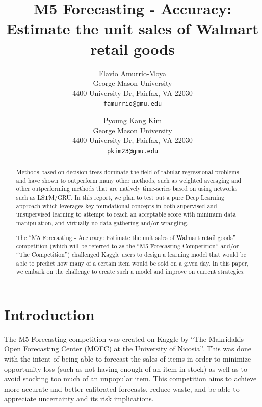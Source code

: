 \documentclass[10pt,twocolumn,letterpaper]{article}
\begin{document}
\title{M5 Forecasting - Accuracy: Estimate the unit sales of Walmart retail goods}

\author{Flavio Amurrio-Moya\\
George Mason University\\
4400 University Dr, Fairfax, VA 22030\\
{\tt\small famurrio@gmu.edu}
\and
Pyoung Kang Kim\\
George Mason University\\
4400 University Dr, Fairfax, VA 22030\\
{\tt\small pkim23@gmu.edu}
}

\maketitle
\thispagestyle{empty}

\begin{abstract}
  Methods based on decision trees dominate the field of tabular regressional
  problems and have shown to outperform many other methods, such as weighted
  averaging and other outperforming methods that are natively time-series based
  on using networks such as LSTM/GRU. In this report, we plan to test out a pure
  Deep Learning approach which leverages key foundational concepts in both
  supervised and unsupervised learning to attempt to reach an acceptable score
  with minimum data manipulation, and virtually no data gathering and/or
  wrangling.

  The ``M5 Forecasting - Accuracy: Estimate the unit sales of Walmart retail
  goods'' competition (which will be referred to as the ``M5 Forecasting
  Competition'' and/or ``The Competition'') challenged Kaggle users to design a
  learning model that would be able to predict how many of a certain item would
  be sold on a given day. In this paper, we embark on the challenge to create
  such a model and improve on current strategies.

\end{abstract}

\section{Introduction}
The M5 Forecasting competition was created on Kaggle by ``The Makridakis Open
Forecasting Center (MOFC) at the University of Nicosia''. This was done with the
intent of being able to forecast the sales of items in order to minimize
opportunity loss (such as not having enough of an item in stock) as well as to
avoid stocking too much of an unpopular item. This competition aims to achieve
more accurate and better-calibrated forecasts, reduce waste, and be able to
appreciate uncertainty and its risk implications. \cite{kaggle}
\end{document}
